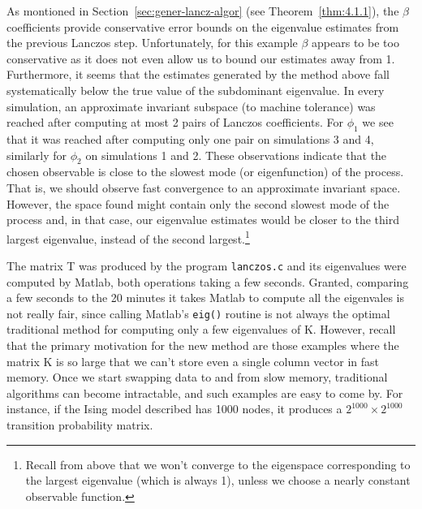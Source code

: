 As montioned in Section~\ref{sec:gener-lancz-algor} (see
Theorem~\ref{thm:4.1.1}), the $\beta$ coefficients provide conservative error 
bounds on the eigenvalue estimates from the previous Lanczos
step. Unfortunately, for this example $\beta$ appears to be too conservative as
it does not even allow us to bound our estimates away from 1. Furthermore, it  
seems that the estimates generated by the method above fall systematically below
the true value of the subdominant eigenvalue. In every simulation, an
approximate invariant subspace (to machine tolerance) was reached after
computing at most 2 pairs of Lanczos coefficients. For $\phi_1$ we see that 
it was reached after computing only one pair on simulations 3 and 4, similarly
for $\phi_2$ on simulations 1 and 2. These observations indicate that the chosen
observable is close to the slowest mode (or 
eigenfunction) of the process. That is, we should observe fast convergence to an approximate
invariant space. However, the space found might contain only the second slowest mode of the
process and, in that case, our eigenvalue estimates would be closer to the third largest eigenvalue,
instead of the second largest.\footnote{Recall from above that we won't
converge to the eigenspace corresponding to the largest eigenvalue 
(which is always 1), unless we choose a nearly constant observable function.}

The matrix T was produced by the program {\tt lanczos.c} and its eigenvalues were computed
by Matlab, both operations taking a few seconds. Granted, comparing a few seconds to the 20
minutes it takes Matlab to compute all the eigenvales is not really fair, 
since calling Matlab's {\tt eig()} routine is not always the
%
%
%
%
optimal traditional method for computing only a few eigenvalues of K. However, recall that
the primary motivation for the new method are those examples where the matrix K is so large
that we can't store even a single column vector in fast memory. Once we start
swapping data to and from slow memory, traditional algorithms can become
intractable, and such examples are easy to come by. For instance, if the Ising
model described has 1000 nodes, it produces a $2^{1000}\times 2^{1000}$
transition probability matrix.
%
%
%
%




